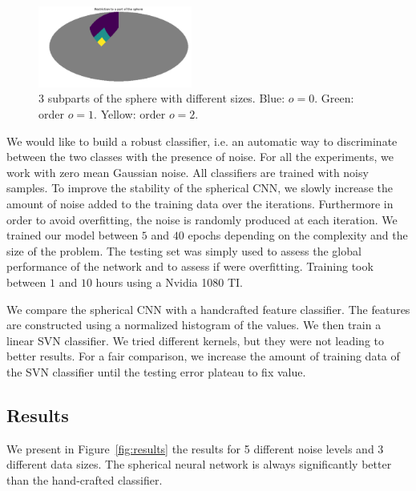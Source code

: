 \documentclass[final,twocolumn,3p,times,authoryear]{elsarticle}
\newcommand{\todo}[1]{{\color[rgb]{.6,.1,.6}{#1}}}
\newcommand{\assign}[1]{{\color[rgb]{.8,.5,.8}{Assigned: #1 }}}
\newcommand{\1}{\b{1}}              %
\newcommand{\0}{\b{0}}              %
\begin{document}
\begin{figure}[!ht]
\centering
\includegraphics[width=0.45\textwidth]{figures/part_sphere.pdf}
\caption{3 subparts of the sphere with different sizes. Blue: $o=0$. Green: order $o=1$. Yellow: order $o=2$.}
\label{fig:subpart_sphere}
\end{figure}

We would like to build a robust classifier, i.e. an automatic way to
discriminate between the two classes with the presence of noise. For all the
experiments, we work with zero mean Gaussian noise. \todo{Tomek: could you put a
justification.} All classifiers are trained with noisy samples. To improve the
stability of the spherical CNN, we slowly increase the amount of noise added to
the training data over the iterations. Furthermore in order to avoid
overfitting, the noise is randomly produced at each iteration. We trained our
model between $5$ and $40$ epochs depending on the complexity and the size of
the problem. The testing set was simply used to assess the global performance of
the network and to assess if were overfitting. 
Training took between $1$ and $10$ hours using a Nvidia 1080 TI.

We compare the spherical CNN with a handcrafted feature classifier. \cite{...}
\todo{Tomek: we probably need 1 or two other classifiers.} The features are
constructed using a normalized histogram of the values. We then train a linear
SVN classifier. We tried different kernels, but they were not leading to better
results. For a fair comparison, we increase the amount of training data of the
SVN classifier until the testing error plateau to fix value.

\subsection{Results}
\assign{Nathanaël, Tomek}

We present in Figure~\ref{fig:results} the results for 5 different noise levels and $3$ different data sizes. The spherical neural network is always significantly better than the hand-crafted classifier.
\end{document}
